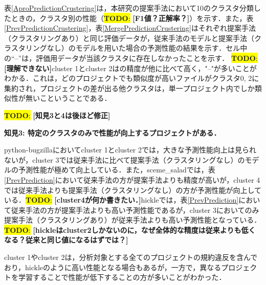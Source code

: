 \documentclass[T,J]{fose} %
\newcommand{\todo}[1]{\colorbox{yellow}{{\bf TODO}:}{\color{red} {\textbf{[#1]}}}}
\begin{document}
表\ref{AproPredictionCrustering}は，本研究の提案手法において10のクラスタ分類したときの，クラスタ別の性能（\todo{F1値？正解率？}）を示す．また，表\ref{PrevPredictionCrustering}，表\ref{MergePredictionCrustering}はそれぞれ提案手法（クラスタリングあり）と同じ評価データが，従来手法のモデルと提案手法（クラスタリングなし）のモデルを用いた場合の予測性能の結果を示す．セル中の``--''は，評価用データが当該クラスタに存在しなかったことを示す．
\todo{理解できない}cluster 1とcluster 2はの精度が他に比べて高く，"--"が多いことがわかる．これは，どのプロジェクトでも類似度が高いファイルがクラスタ0, 2に集約され，プロジェクトの差が出る他クラスタは，単一プロジェクト内でしか類似性が無いこということである．

\todo{知見3と4は後ほど修正}

\noindent\textbf{知見3: 特定のクラスタのみで性能が向上するプロジェクトがある．}

python-bugzillaにおいてcluster 1とcluster 2では，大きな予測性能向上は見られないが，cluster 3では従来手法に比べて提案手法（クラスタリングなし）のモデルの予測性能が極めて向上している．また，sceme\_saladでは，表\ref{PrevPrediction}において従来手法の方が提案手法よりも精度が高いが，cluster 4では従来手法よりも提案手法（クラスタリングなし）の方が予測性能が向上している．\todo{cluster4が何か書きたい．}hickleでは，表\ref{PrevPrediction}において従来手法の方が提案手法よりも高い予測性能であるが，cluster 3においてのみ提案手法（クラスタリングあり）が従来手法よりも高い予測性能となっている．\todo{hickleはcluster2しかないのに，なぜ全体的な精度は従来よりも低くなる？従来と同じ値になるはずでは？}


cluster 1やcluster 2は，分析対象とする全てのプロジェクトの規約違反を含んでおり，hickleのように高い性能となる場合もあるが，一方で，異なるプロジェクトを学習することで性能が低下することの方が多いことがわかった．




\end{document}
